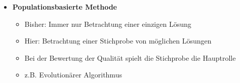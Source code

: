 \begin{itemize}
\begin{itemize}
\begin{itemize}
                        \item \textit{Code}
                            \begin{itemize}
                                \item[]
                                    \begin{verbatim}
                                    TABU-SEARCH
                                    l <- maximale Größe der Tabu List
                                    n <- Anzahl der zu betrachtenden Nachbarschaftslösungen
                                    S <- irgendeine initiale zufällige Lösung
                                    best <- S
                                    L <- { } Tabu List der Länge l
                                    Füge S in L ein
                                    REPEAT
                                        IF Length(L) > l THEN
                                            Entferne ältestes Element aus L
                                        wähle R aus Nachbarschaft von S
                                        FOR n - 1 mal DO
                                            Wähle W aus Nachbarschaft von S
                                            IF W |$\notin$| L und (Quality(W) > Quality(R)) oder R |$\in$| L) THEN
                                                R <- W
                                        IF R |$\notin$| L THEN
                                            S <- R
                                            Füge R in L ein
                                        IF Quality(S) > Quality(best) THEN
                                            best <- S
                                    UNTIL best ist die ideale Lösung oder totale Zeit erreicht
                                    return best
                                    \end{verbatim}
                            \end{itemize}
                    \end{itemize}
            \end{itemize}

        \item \textbf{Populationsbasierte Methode}
            \begin{itemize}
                \item Bisher: Immer nur Betrachtung einer einzigen Lösung
                \item Hier: Betrachtung einer Stichprobe von möglichen Lösungen
                \item Bei der Bewertung der Qualität spielt die Stichprobe die Hauptrolle
                \item z.B. Evolutionärer Algorithmus
            \end{itemize}
        

\end{itemize}
